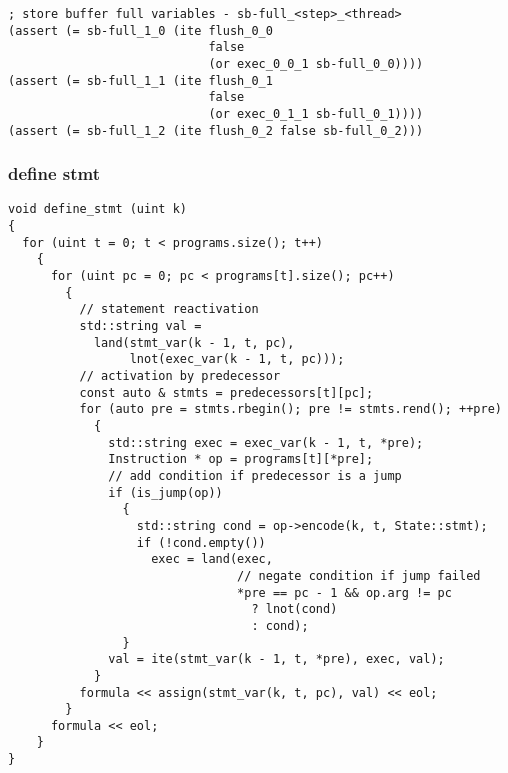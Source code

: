\begin{lstlisting}[language=SMTLib]
; store buffer full variables - sb-full_<step>_<thread>
(assert (= sb-full_1_0 (ite flush_0_0
                            false
                            (or exec_0_0_1 sb-full_0_0))))
(assert (= sb-full_1_1 (ite flush_0_1
                            false
                            (or exec_0_1_1 sb-full_0_1))))
(assert (= sb-full_1_2 (ite flush_0_2 false sb-full_0_2)))
\end{lstlisting}

\subsubsection{define stmt}


\begin{lstlisting}[style=c++]
void define_stmt (uint k)
{
  for (uint t = 0; t < programs.size(); t++)
    {
      for (uint pc = 0; pc < programs[t].size(); pc++)
        {
          // statement reactivation
          std::string val =
            land(stmt_var(k - 1, t, pc),
                 lnot(exec_var(k - 1, t, pc)));
          // activation by predecessor
          const auto & stmts = predecessors[t][pc];
          for (auto pre = stmts.rbegin(); pre != stmts.rend(); ++pre)
            {
              std::string exec = exec_var(k - 1, t, *pre);
              Instruction * op = programs[t][*pre];
              // add condition if predecessor is a jump
              if (is_jump(op))
                {
                  std::string cond = op->encode(k, t, State::stmt);
                  if (!cond.empty())
                    exec = land(exec,
                                // negate condition if jump failed
                                *pre == pc - 1 && op.arg != pc
                                  ? lnot(cond)
                                  : cond);
                }
              val = ite(stmt_var(k - 1, t, *pre), exec, val);
            }
          formula << assign(stmt_var(k, t, pc), val) << eol;
        }
      formula << eol;
    }
}
\end{lstlisting}

